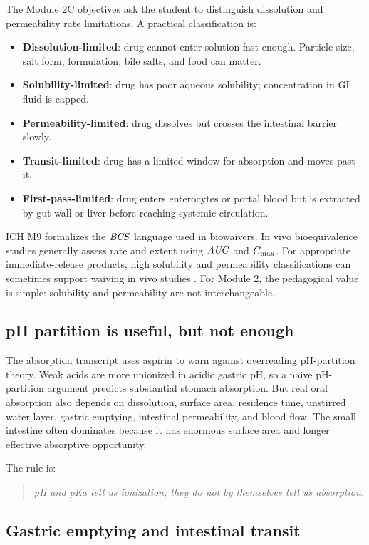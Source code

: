 \documentclass[a4paper]{article}
\newcommand{\AUC}{\ensuremath{\pksym{AUC}}}
\newcommand{\Cmax}{\ensuremath{C_{\pklab{max}}}}
\newcommand{\BCS}{\ensuremath{\pksym{BCS}}}
\begin{document}
The Module 2C objectives ask the student to distinguish dissolution and permeability rate limitations. A practical classification is:
\begin{itemize}[leftmargin=2em]
  \item \textbf{Dissolution-limited}: drug cannot enter solution fast enough. Particle size, salt form, formulation, bile salts, and food can matter.
  \item \textbf{Solubility-limited}: drug has poor aqueous solubility; concentration in GI fluid is capped.
  \item \textbf{Permeability-limited}: drug dissolves but crosses the intestinal barrier slowly.
  \item \textbf{Transit-limited}: drug has a limited window for absorption and moves past it.
  \item \textbf{First-pass-limited}: drug enters enterocytes or portal blood but is extracted by gut wall or liver before reaching systemic circulation.
\end{itemize}

ICH M9 formalizes the \BCS{} language used in biowaivers. In vivo bioequivalence studies generally assess rate and extent using \(\AUC\) and \(\Cmax\). For appropriate immediate-release products, high solubility and permeability classifications can sometimes support waiving in vivo studies \cite{ichM9Bcs2021}. For Module 2, the pedagogical value is simple: solubility and permeability are not interchangeable.

\subsection{pH partition is useful, but not enough}

The absorption transcript uses aspirin to warn against overreading pH-partition theory. Weak acids are more unionized in acidic gastric pH, so a naive pH-partition argument predicts substantial stomach absorption. But real oral absorption also depends on dissolution, surface area, residence time, unstirred water layer, gastric emptying, intestinal permeability, and blood flow. The small intestine often dominates because it has enormous surface area and longer effective absorptive opportunity.

The rule is:
\begin{quote}
\itshape
pH and pKa tell us ionization; they do not by themselves tell us absorption.
\end{quote}

\subsection{Gastric emptying and intestinal transit}
\end{document}

